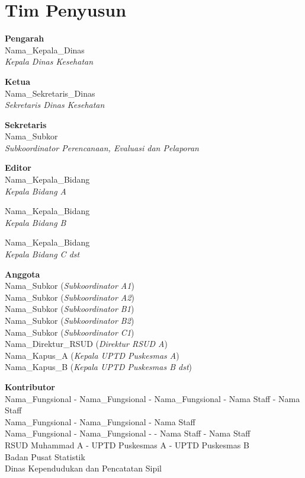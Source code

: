 {}

\section*{Tim Penyusun}
{\parindent0pt
\textbf{Pengarah}\\
\smallskip
Nama_Kepala_Dinas\\
\emph{Kepala Dinas Kesehatan \namaKabupaten}
\bigskip{}

\textbf{Ketua}\\
\smallskip
Nama_Sekretaris_Dinas\\
\emph{Sekretaris Dinas Kesehatan}
\bigskip{}

\textbf{Sekretaris}\\
\smallskip
Nama_Subkor\\
\emph{Subkoordinator Perencanaan, Evaluasi dan Pelaporan}
\bigskip{}

\textbf{Editor}\\
\smallskip
Nama_Kepala_Bidang\\
\emph{Kepala Bidang A}
\smallskip

Nama_Kepala_Bidang\\
\emph{Kepala Bidang B}
\smallskip

Nama_Kepala_Bidang\\
\emph{Kepala Bidang C dst}
\bigskip

\textbf{Anggota}\\
\smallskip
Nama_Subkor (\emph{Subkoordinator A1})\\
\smallskip
Nama_Subkor (\emph{Subkoordinator A2})\\
\smallskip
Nama_Subkor (\emph{Subkoordinator B1})\\
\smallskip
Nama_Subkor (\emph{Subkoordinator B2})\\
\smallskip
Nama_Subkor (\emph{Subkoordinator C1})\\
\smallskip
Nama_Direktur_RSUD (\emph{Direktur RSUD A})\\
\smallskip
Nama_Kapus_A (\emph{Kepala UPTD Puskesmas A})\\
\smallskip
Nama_Kapus_B (\emph{Kepala UPTD Puskesmas B dst})\\
\bigskip

\begin{raggedright}
\textbf{Kontributor}\\
\smallskip
Nama_Fungsional - Nama_Fungsional - Nama_Fungsional - Nama Staff - Nama Staff\\
\smallskip
Nama_Fungsional - Nama_Fungsional - Nama Staff\\
\smallskip
Nama_Fungsional - Nama_Fungsional - - Nama Staff - Nama Staff\\
\smallskip
RSUD Muhammad A - UPTD Puskesmas A - UPTD Puskesmas B \\
\smallskip
Badan Pusat Statistik \namaKabupaten\\
\smallskip
Dinas Kependudukan dan Pencatatan Sipil \namaKabupaten
\end{raggedright}

}